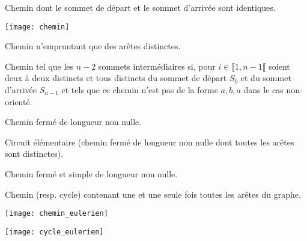 \begin{defi}
Chemin dont le sommet de départ et le sommet d'arrivée sont identiques.
\end{defi}


\begin{marginfigure}
\texttt{[image: chemin]}
\end{marginfigure}

\begin{defi}

Chemin n'empruntant que des arêtes distinctes.

\end{defi}

\begin{defi}
Chemin tel que les $n - 2$ sommets intermédiaires si, pour $i \in \llbracket 1, n-1\llbracket$ soient
deux à deux distincts et tous distincts du sommet de départ $S_0$ et du sommet d’arrivée $S_{n-1}$ et tels
que ce chemin n’est pas de la forme $a, b, a$ dans le cas non-orienté.
\end{defi}

\begin{defi}[Circuit]
Chemin fermé de longueur non nulle.
\end{defi}


\begin{defi}[Cycle]
Circuit élémentaire (chemin fermé de longueur non nulle dont toutes les arêtes sont distinctes).
\end{defi}

\begin{defi}
Chemin fermé et simple de longueur non nulle.
\end{defi}

\begin{defi}

\noindent\begin{minipage}{.55\linewidth}
Chemin (resp. cycle) contenant une et une seule fois toutes les arêtes du graphe.
\end{minipage} \hfill
\begin{minipage}{.2\linewidth}
\texttt{[image: chemin\_eulerien]}
\end{minipage}
 \hfill
\begin{minipage}{.2\linewidth}
\texttt{[image: cycle\_eulerien]}
\end{minipage}
\end{defi}

